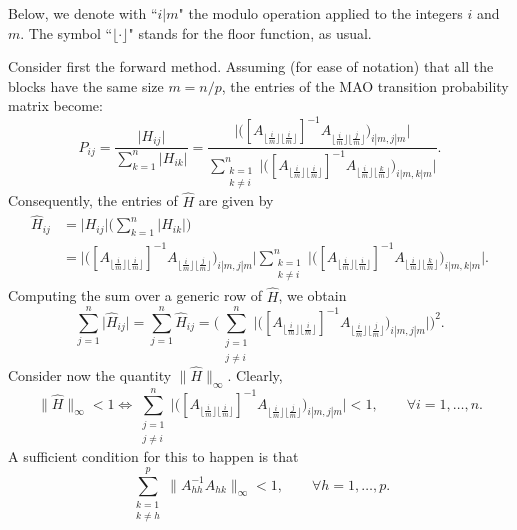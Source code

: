 \documentclass[final,leqno,onefignum,onetabnum]{siamltex1213}
\begin{document}
Below, we denote with ``$i|m$" the 
modulo operation applied to the integers $i$ and $m$. The 
symbol ``$\lfloor \cdot \rfloor$" stands for the floor function, as usual.

Consider first the forward method. Assuming (for ease of notation)
that all the blocks have the same size $m=n/p$,
the entries of the MAO transition probability matrix become:
\[
 P_{ij}=\frac{\lvert H_{ij} \rvert}{\sum_{k=1}^n\lvert H_{ik}
\rvert}=\frac{\bigg \lvert \bigg ([A_{\lfloor
\frac{i}{m}\rfloor \lfloor 
\frac{i}{m}\rfloor}]^{-1} A_{\lfloor \frac{i}{m}\rfloor \lfloor
\frac{j}{m}\rfloor}\bigg )_{i|m,j|m}\bigg
\rvert}{\displaystyle \sum_{\substack{k=1\\k\ne i}}^n\bigg \lvert \bigg
([A_{\lfloor
\frac{i}{m}\rfloor \lfloor
\frac{i}{m}\rfloor}]^{-1} A_{\lfloor \frac{i}{m}\rfloor \lfloor
\frac{k}{m}\rfloor}\bigg )_{i|m,k|m}\bigg \rvert}.
\]
Consequently, the entries of $\hat{H}$ are given by
\[
\begin{array}{rl}
\hat{H}_{ij} & = \lvert H_{ij}\rvert\bigg(\sum_{k=1}^n\lvert H_{ik}\rvert\bigg)\\
& =
\bigg \lvert \bigg ([A_{\lfloor \frac{i}{m}\rfloor \lfloor
\frac{i}{m}\rfloor}]^{-1} A_{\lfloor \frac{i}{m}\rfloor \lfloor
\frac{j}{m}\rfloor}\bigg )_{i|m,j|m}\bigg
\rvert
{\displaystyle
\sum_{\substack{k=1\\k\ne i}}^n\bigg \lvert \bigg ([A_{\lfloor
\frac{i}{m}\rfloor \lfloor
\frac{i}{m}\rfloor}]^{-1} A_{\lfloor \frac{i}{m}\rfloor \lfloor
\frac{k}{m}\rfloor}\bigg )_{i|m,k|m}\bigg \rvert.
}
\end{array}
\]
Computing the sum over a generic row of $\hat{H}$, we obtain 
\[
 \sum_{j=1}^n \lvert \hat{H}_{ij}\rvert=\sum_{j=1}^n \hat{H}_{ij} =
 \bigg ( \sum_{\substack{j=1\\j\ne i}}^n\bigg \lvert \bigg ([A_{\lfloor
\frac{i}{m}\rfloor \lfloor
\frac{i}{m}\rfloor}]^{-1} A_{\lfloor \frac{i}{m}\rfloor \lfloor
\frac{j}{m}\rfloor}\bigg )_{i|m,j|m}\bigg \rvert \bigg ) ^2.
\]
Consider now the quantity $\lVert \hat{H}\rVert_{\infty}$. Clearly,
\[
 \lVert \hat{H}\rVert_{\infty}<1 \Leftrightarrow \sum_{\substack{j=1\\j\ne
i}}^n\bigg \lvert \bigg ([A_{\lfloor
\frac{i}{m}\rfloor \lfloor
\frac{i}{m}\rfloor}]^{-1} A_{\lfloor \frac{i}{m}\rfloor \lfloor
\frac{j}{m}\rfloor}\bigg )_{i|m,j|m}\bigg \rvert <1, \qquad \forall
i=1,\ldots,n.
\]
 A sufficient condition for this to happen is that
 \begin{equation}
  \sum_{\substack{k=1\\k\ne h}}^p \lVert A_{hh}^{-1}A_{hk}\rVert_{\infty}<1,
    \label{block_cs}\qquad \forall h=1,\ldots,p.
 \end{equation}
\end{document}
